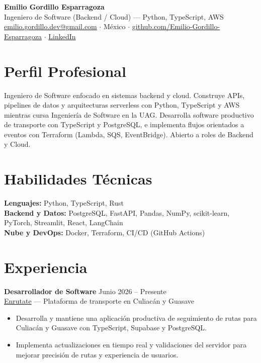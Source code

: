 \documentclass[10pt,a4paper]{article}
\begin{document}
\fontsize{9.5pt}{11.8pt}\selectfont

\begin{center}
    {\LARGE\textbf{Emilio Gordillo Esparragoza}}\\[3pt]
    Ingeniero de Software (Backend / Cloud) --- Python, TypeScript, AWS\\[4pt]
    \href{mailto:emilio.gordillo.dev@gmail.com}{emilio.gordillo.dev@gmail.com}
    $\cdot$ M\'exico
    $\cdot$ \href{https://github.com/Emilio-Gordillo-Esparragoza}{github.com/Emilio-Gordillo-Esparragoza}
    $\cdot$ \href{https://www.linkedin.com/in/emilio-gordillo-esparragoza-948267397/}{LinkedIn}
\end{center}

\section*{Perfil Profesional}
Ingeniero de Software enfocado en sistemas backend y cloud. Construye APIs, pipelines de datos y arquitecturas serverless con Python, TypeScript y AWS mientras cursa Ingenier\'ia de Software en la UAG. Desarrolla software productivo de transporte con TypeScript y PostgreSQL, e implementa flujos orientados a eventos con Terraform (Lambda, SQS, EventBridge). Abierto a roles de Backend y Cloud.

\section*{Habilidades T\'ecnicas}
\textbf{Lenguajes:} Python, TypeScript, Rust\\
\textbf{Backend y Datos:} PostgreSQL, FastAPI, Pandas, NumPy, scikit-learn, PyTorch, Streamlit, React, LangChain\\
\textbf{Nube y DevOps:} Docker, Terraform, CI/CD (GitHub Actions)

\section*{Experiencia}

\textbf{Desarrollador de Software} \hfill Junio 2026 -- Presente\\
\href{https://www.enrutate.com/}{Enrutate} --- Plataforma de transporte en Culiac\'an y Guasave\\
\begin{itemize}
    \item Desarrolla y mantiene una aplicaci\'on productiva de seguimiento de rutas para Culiac\'an y Guasave con TypeScript, Supabase y PostgreSQL.
    \item Implementa actualizaciones en tiempo real y validaciones del servidor para mejorar precisi\'on de rutas y experiencia de usuarios.
\end{itemize}
\end{document}
